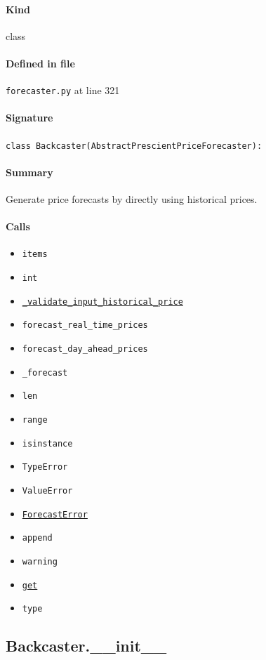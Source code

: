 \documentclass[11pt]{report}
\begin{document}
\paragraph{Kind} class
\paragraph{Defined in file} \texttt{forecaster.py} at line 321
\paragraph{Signature} \texttt{class Backcaster(AbstractPrescientPriceForecaster):}
\paragraph{Summary} Generate price forecasts by directly using historical prices.
\paragraph{Calls}
\begin{itemize}[leftmargin=*]
  \item \texttt{items}
  \item \texttt{int}
  \item \hyperref[def:forecaster.py:Backcaster._validate_input_historical_price:L348]{\texttt{\_validate\_input\_historical\_price}}
  \item \texttt{forecast\_real\_time\_prices}
  \item \texttt{forecast\_day\_ahead\_prices}
  \item \texttt{\_forecast}
  \item \texttt{len}
  \item \texttt{range}
  \item \texttt{isinstance}
  \item \texttt{TypeError}
  \item \texttt{ValueError}
  \item \hyperref[def:forecaster.py:ForecastError:L22]{\texttt{ForecastError}}
  \item \texttt{append}
  \item \texttt{warning}
  \item \hyperref[def:tests-test_backcaster.py:DAPrices.get:L294]{\texttt{get}}
  \item \texttt{type}
\end{itemize}
\subsection{Backcaster.\_\_init\_\_}
\label{def:forecaster.py:Backcaster.__init__:L326}
\end{document}
